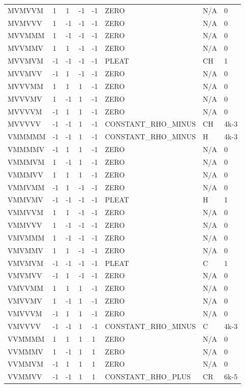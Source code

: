 \documentclass[10pt]{article}
\begin{document}
\begin{longtable}{llllllll}
MVMVVM & 1 & 1 & -1 & -1 & ZERO & N/A & 0 \\
MVMVVV & 1 & -1 & -1 & -1 & ZERO & N/A & 0 \\
MVVMMM & 1 & -1 & -1 & -1 & ZERO & N/A & 0 \\
MVVMMV & 1 & 1 & -1 & -1 & ZERO & N/A & 0 \\
MVVMVM & -1 & -1 & -1 & -1 & PLEAT & CH & 1 \\
MVVMVV & -1 & 1 & -1 & -1 & ZERO & N/A & 0 \\
MVVVMM & 1 & 1 & 1 & -1 & ZERO & N/A & 0 \\
MVVVMV & 1 & -1 & 1 & -1 & ZERO & N/A & 0 \\
MVVVVM & -1 & 1 & 1 & -1 & ZERO & N/A & 0 \\
MVVVVV & -1 & -1 & 1 & -1 & CONSTANT\_RHO\_MINUS & CH & 4k-3 \\
VMMMMM & -1 & -1 & 1 & -1 & CONSTANT\_RHO\_MINUS & H & 4k-3 \\
VMMMMV & -1 & 1 & 1 & -1 & ZERO & N/A & 0 \\
VMMMVM & 1 & -1 & 1 & -1 & ZERO & N/A & 0 \\
VMMMVV & 1 & 1 & 1 & -1 & ZERO & N/A & 0 \\
VMMVMM & -1 & 1 & -1 & -1 & ZERO & N/A & 0 \\
VMMVMV & -1 & -1 & -1 & -1 & PLEAT & H & 1 \\
VMMVVM & 1 & 1 & -1 & -1 & ZERO & N/A & 0 \\
VMMVVV & 1 & -1 & -1 & -1 & ZERO & N/A & 0 \\
VMVMMM & 1 & -1 & -1 & -1 & ZERO & N/A & 0 \\
VMVMMV & 1 & 1 & -1 & -1 & ZERO & N/A & 0 \\
VMVMVM & -1 & -1 & -1 & -1 & PLEAT & C & 1 \\
VMVMVV & -1 & 1 & -1 & -1 & ZERO & N/A & 0 \\
VMVVMM & 1 & 1 & 1 & -1 & ZERO & N/A & 0 \\
VMVVMV & 1 & -1 & 1 & -1 & ZERO & N/A & 0 \\
VMVVVM & -1 & 1 & 1 & -1 & ZERO & N/A & 0 \\
VMVVVV & -1 & -1 & 1 & -1 & CONSTANT\_RHO\_MINUS & C & 4k-3 \\
VVMMMM & 1 & 1 & 1 & 1 & ZERO & N/A & 0 \\
VVMMMV & 1 & -1 & 1 & 1 & ZERO & N/A & 0 \\
VVMMVM & -1 & 1 & 1 & 1 & ZERO & N/A & 0 \\
VVMMVV & -1 & -1 & 1 & 1 & CONSTANT\_RHO\_PLUS & CR & 6k-5 \\

\end{longtable}
\end{document}
